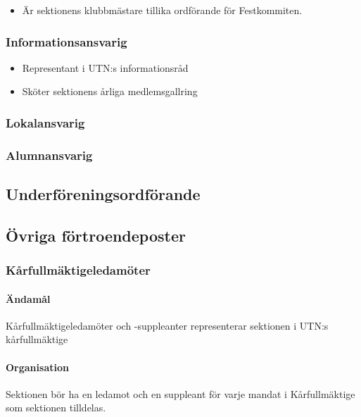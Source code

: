 \documentclass{../resources/dgovdoc}
\begin{document}
\begin{itemize}
	\item Är sektionens klubbmästare tillika ordförande för Festkommiten.
\end{itemize}

\subsubsection{Informationsansvarig}

\begin{itemize}
	\item Representant i UTN:s informationsråd
	\item Sköter sektionens årliga medlemsgallring
\end{itemize}

\subsubsection{Lokalansvarig}

\subsubsection{Alumnansvarig}

\subsection{Underföreningsordförande}

\subsection{Övriga förtroendeposter}

\subsubsection{Kårfullmäktigeledamöter}

\paragraph{Ändamål}

Kårfullmäktigeledamöter och -suppleanter representerar sektionen i UTN:s kårfullmäktige

\paragraph{Organisation}

Sektionen bör ha en ledamot och en suppleant för varje mandat i Kårfullmäktige som sektionen tilldelas.
\end{document}
